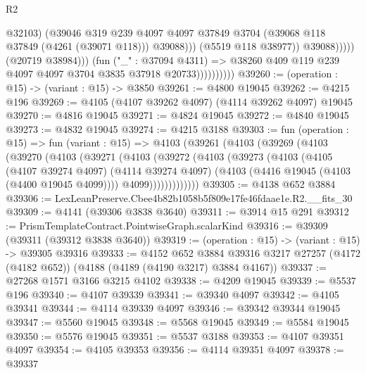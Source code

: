 \begin{lexlean}{R2}
\begin{coremodule}
                                            @32103)
                                          (@39046
                                            @319
                                            @239
                                            @4097
                                            @4097
                                            @37849
                                            @3704
                                            (@39068 @118 @37849 (@4261 (@39071 @118)))
                                            @39088)))
                                      (@5519 @118 @38977))
                                    @39088)))))
                          (@20719 @38984)))
                      (fun ("_" : @37094 @4311) =>
                      @38260 @409 @119 @239 @4097 @4097 @3704 @3835 @37918 @20733))))))))))
@39260 := (operation : @15) -> (variant : @15) -> @3850
@39261 := @4800 @19045
@39262 := @4215 @196
@39269 := @4105 (@4107 @39262 @4097) (@4114 @39262 @4097) @19045
@39270 := @4816 @19045
@39271 := @4824 @19045
@39272 := @4840 @19045
@39273 := @4832 @19045
@39274 := @4215 @3188
@39303 := fun (operation : @15) =>
  fun (variant : @15) =>
  @4103
    (@39261
      (@4103
        (@39269
          (@4103
            (@39270
              (@4103
                (@39271
                  (@4103
                    (@39272
                      (@4103
                        (@39273
                          (@4103
                            (@4105
                              (@4107 @39274 @4097)
                              (@4114 @39274 @4097)
                              (@4103 (@4416 @19045 (@4103 (@4400 @19045 @4099))))
                              @4099)))))))))))))
@39305 := @4138 @652 @3884
@39306 := LexLeanPreserve.Cbee4b82b1058b5f809e17fe46fdaae1e.R2.__fits_30
@39309 := @4141 (@39306 @3838 @3640)
@39311 := @3914 @15 @291
@39312 := PrismTemplateContract.PointwiseGraph.scalarKind
@39316 := @39309 (@39311 (@39312 @3838 @3640))
@39319 := (operation : @15) -> (variant : @15) -> @39305 @39316
@39333 := @4152
    @652
    @3884
    @39316
    @3217
    @27257
    (@4172 (@4182 @652))
    (@4188 (@4189 (@4190 @3217) @3884 @4167))
@39337 := @27268 @1571 @3166 @3215 @4102
@39338 := @4209 @19045
@39339 := @5537 @196
@39340 := @4107 @39339
@39341 := @39340 @4097
@39342 := @4105 @39341
@39344 := @4114 @39339 @4097
@39346 := @39342 @39344 @19045
@39347 := @5560 @19045
@39348 := @5568 @19045
@39349 := @5584 @19045
@39350 := @5576 @19045
@39351 := @5537 @3188
@39353 := @4107 @39351 @4097
@39354 := @4105 @39353
@39356 := @4114 @39351 @4097
@39378 := @39337

\end{coremodule}
\end{lexlean}
